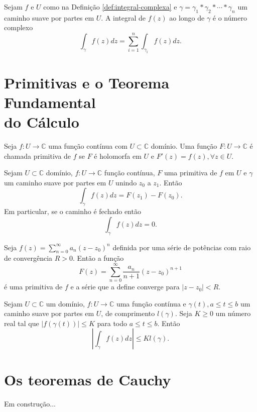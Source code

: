 \begin{definicao}
Sejam $f$ e $U$ como na Definição \ref{def:integral-complexa} e
$\gamma = \gamma_1*\gamma_2*\cdots*\gamma_n$ um caminho suave por partes em $U$.
A integral de $f(z)$ ao longo de $\gamma$ é o número complexo
\begin{equation*}
    \int_{\gamma} f(z)dz = \sum_{i=1}^n\int_{\gamma_i} f(z)dz.
\end{equation*}
\end{definicao}



\section[Primitivas e o Teorema Fundamental do Cálculo]
{Primitivas e o Teorema Fundamental\\ do Cálculo}

\begin{definicao}
\label{def:primitiva-complexa}
Seja $f:U \to \mathbb{C}$ uma função contínua com $U\subset\mathbb{C}$ domínio. Uma função $F:U\to\mathbb{C}$
é chamada primitiva de $f$ se $F$ é holomorfa em $U$ e $F'(z) = f(z), \forall z\in U$.
\end{definicao}

\begin{teorema}
Sejam $U\subset\mathbb{C}$ domínio, $f:U\to\mathbb{C}$ função contínua,
$F$ uma primitiva de $f$ em $U$ e $\gamma$ um caminho suave por partes em $U$ unindo $z_0$ a $z_1$. Então
\begin{equation*}
    \int_{\gamma} f(z)dz = F(z_1) - F(z_0).
\end{equation*}
Em particular, se o caminho é fechado então
\begin{equation*}
    \int_{\gamma} f(z)dz = 0.
\end{equation*}
\end{teorema}

\begin{proposicao}
Seja $\displaystyle{ f(z) = \sum_{n=0}^{\infty} a_n(z-z_0)^n }$
definida por uma série de potências com raio de convergência $R>0$.
Então a função
\begin{equation*}
    F(z) = \sum_{n=0}^{\infty} \frac{a_n}{n+1}(z-z_0)^{n+1}
\end{equation*}
é uma primitiva de $f$ e a série que a define converge para $|z-z_0| < R$.
\end{proposicao}

\begin{lema}
Sejam $U\subset\mathbb{C}$ um domínio, $f:U\to\mathbb{C}$ uma função contínua e
$\gamma(t), a\leq t\leq b$ um caminho suave por partes em $U$, de comprimento $l(\gamma)$.
Seja $K\geq 0$ um número real tal que $|f(\gamma(t))| \leq K$ para todo $a\leq t\leq b$. Então
\begin{equation*}
    \left| \int_{\gamma}f(z)dz \right| \leq Kl(\gamma).
\end{equation*}
\end{lema}


\section[Os teoremas de Cauchy]{Os teoremas de Cauchy}
\begin{center}
Em construção...
\end{center}